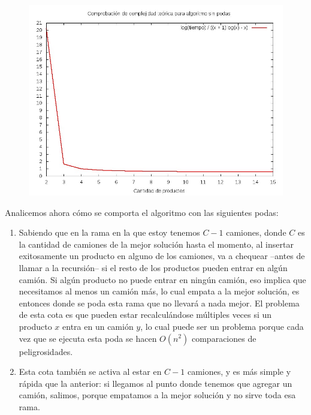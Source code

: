 \begin{figure}[H]
	\begin{minipage}[t]{\linewidth}
		\centering
		\includegraphics[width=\textwidth]{complejidad.jpg}
		\label{fig:p3_complejidad}
	\end{minipage}
\end{figure}

Analicemos ahora cómo se comporta el algoritmo con las siguientes podas: 
\begin{enumerate}
\item Sabiendo que en la rama en la que estoy tenemos $C-1$ camiones, donde $C$ es la cantidad de camiones de la mejor solución hasta el momento, al insertar exitosamente un producto en alguno de los camiones, va a chequear --antes de llamar a la recursión-- si el resto de los productos pueden entrar en algún camión. Si algún producto no puede entrar en ningún camión, eso implica que necesitamos al menos un camión más, lo cual empata a la mejor solución, es entonces donde se poda esta rama que no llevará a nada mejor. El problema de esta cota es que pueden estar recalculándose múltiples veces si un producto $x$ entra en un camión $y$, lo cual puede ser un problema porque cada vez que se ejecuta esta poda se hacen $O(n^2)$ comparaciones de peligrosidades.
\item Esta cota también se activa al estar en $C-1$ camiones, y es más simple y rápida que la anterior: si llegamos al punto donde tenemos que agregar un camión, salimos, porque empatamos a la mejor solución y no sirve toda esa rama.
\end{enumerate}

